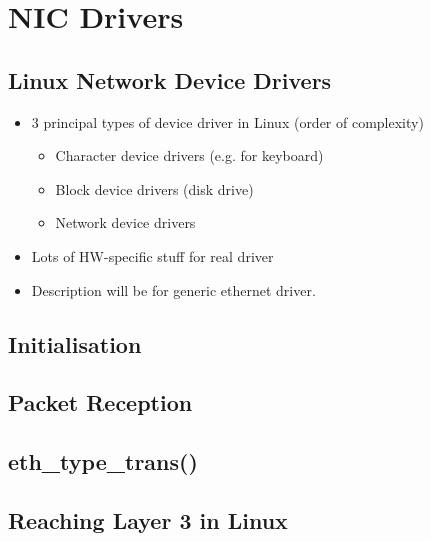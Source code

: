 \section{NIC Drivers}

\subsection{Linux Network Device Drivers}
\begin{itemize}
	\item 3 principal types of device driver in Linux (order of complexity)
	\begin{itemize}
		\item Character device drivers (e.g. for keyboard)
		\item Block device drivers (disk drive)
		\item Network device drivers
	\end{itemize}
	\item Lots of HW-specific stuff for real driver
	\item Description will be for generic ethernet driver.
\end{itemize}

\subsection{Initialisation}



\subsection{Packet Reception}

\subsection{eth\_type\_trans()}

\subsection{Reaching Layer 3 in Linux}

